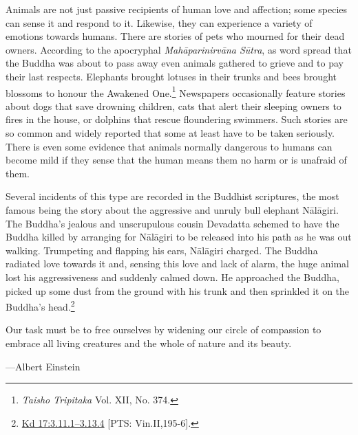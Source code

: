 \documentclass[10pt, openright]{book}
\newenvironment{epigram-2}%
{%
\setstretch{1.4}
\vspace{1em}
\noindent
\quoting[leftmargin=2cm,rightmargin=2cm]%
\begin{itshape}
\large
}%
{\end{itshape}\endquoting
}%
\newenvironment{epigram-2-cite}%
{%
\quoting[leftmargin=2cm,rightmargin=2cm]%
\noindent\normal\hspace*{\fill} 
}%
{\endquoting
}%
\begin{document}
Animals are not just passive recipients of human love and affection; some species can sense it and respond to it. Likewise, they can experience a variety of emotions towards humans. There are stories of pets who mourned for their dead owners. According to the apocryphal \textit{Mahāparinirvāna Sūtra}, as word spread that the Buddha was about to pass away even animals gathered to grieve and to pay their last respects. Elephants brought lotuses in their trunks and bees brought blossoms to honour the Awakened One.\footnote {\textit{Taisho Tripitaka} Vol. XII, No. 374.} Newspapers occasionally feature stories about dogs that save drowning children, cats that alert their sleeping owners to fires in the house, or dolphins that rescue floundering swimmers. Such stories are so common and widely reported that some at least have to be taken seriously. There is even some evidence that animals normally dangerous to humans can become mild if they sense that the human means them no harm or is unafraid of them.


Several incidents of this type are recorded in the Buddhist scriptures, the most famous being the story about the aggressive and unruly bull elephant Nālāgiri. The Buddha’s jealous and unscrupulous cousin Devadatta schemed to have the Buddha killed by arranging for Nālāgiri to be released into his path as he was out walking. Trumpeting and flapping his ears, Nālāgiri charged. The Buddha radiated love towards it and, sensing this love and lack of alarm, the huge animal lost his aggressiveness and suddenly calmed down. He approached the Buddha, picked up some dust from the ground with his trunk and then sprinkled it on the Buddha’s head.\footnote {\href{https://suttacentral.net/pli-tv-kd17/en/brahmali#3.11.1}{Kd 17:3.11.1–3.13.4} [PTS: Vin.II,195-6].}


\begin{epigram-2}
Our task must be to free ourselves by widening our circle of compassion to embrace all living creatures and the whole of nature and its beauty.
\end{epigram-2}
\begin{epigram-2-cite}
—Albert Einstein
\end{epigram-2-cite}
\end{document}
